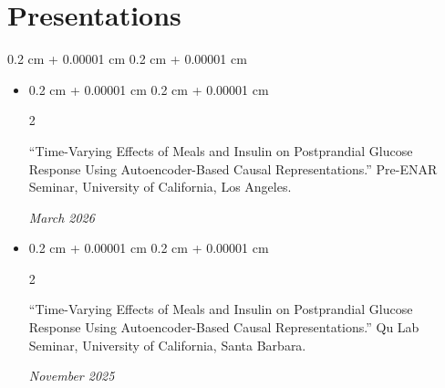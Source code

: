 \documentclass[10pt, letterpaper]{article}
\newenvironment{highlights}{
    \begin{itemize}[
        topsep=0.10 cm,
        parsep=0.10 cm,
        partopsep=0pt,
        itemsep=0pt,
        leftmargin=0.4 cm + 10pt
    ]
}{
    \end{itemize}
} %
\newenvironment{onecolentry}{
    \begin{adjustwidth}{
        0.2 cm + 0.00001 cm
    }{
        0.2 cm + 0.00001 cm
    }
}{
    \end{adjustwidth}
} %
\newenvironment{twocolentry}[2][]{
    \onecolentry
    \def\secondColumn{#2}
    \setcolumnwidth{\fill, 4.5 cm}
    \begin{paracol}{2}
}{
    \switchcolumn \raggedleft \secondColumn
    \end{paracol}
    \endonecolentry
} %
\begin{document}
            
            

        

        \vspace{0.0 cm}


        \vspace{-0.2cm}

\section{Presentations}
    \begin{onecolentry}
        \begin{highlights}
            \item \begin{twocolentry}{\textit{March 2026}}
                    ``Time-Varying Effects of Meals and Insulin on Postprandial Glucose Response Using Autoencoder-Based Causal Representations.'' Pre-ENAR Seminar, University of California, Los Angeles.
                  \end{twocolentry}
            \item \begin{twocolentry}{\textit{November 2025}}
                    ``Time-Varying Effects of Meals and Insulin on Postprandial Glucose Response Using Autoencoder-Based Causal Representations.'' Qu Lab Seminar, University of California, Santa Barbara.
                  \end{twocolentry}
        \end{highlights}
    \end{onecolentry}
\end{document}
